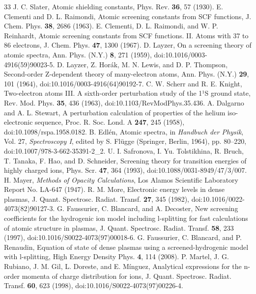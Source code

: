 \documentclass[aps,pra,preprint,notitlepage,superscriptaddress,amsmath,amssymb]{revtex4-2}
\begin{document}
\begin{thebibliography}{33}
 J. C. Slater, Atomic shielding constants, Phys. Rev. \textbf{36}, 57 (1930).
 E. Clementi and D. L. Raimondi, Atomic screening constants from SCF functions, J. Chem. Phys. \textbf{38}, 2686 (1963).
 E. Clementi, D. L. Raimondi, and W. P. Reinhardt, Atomic screening constants from SCF functions. II. Atoms with 37 to 86 electrons, J. Chem. Phys. \textbf{47}, 1300 (1967).
 D. Layzer, On a screening theory of atomic spectra, Ann. Phys. (N.Y.) \textbf{8}, 271 (1959), doi:10.1016/0003-4916(59)90023-5.
 D. Layzer, Z. Horák, M. N. Lewis, and D. P. Thompson, Second-order Z-dependent theory of many-electron atoms, Ann. Phys. (N.Y.) \textbf{29}, 101 (1964), doi:10.1016/0003-4916(64)90192-7.
 C. W. Scherr and R. E. Knight, Two-electron atoms III. A sixth-order perturbation study of the 1¹S ground state, Rev. Mod. Phys. \textbf{35}, 436 (1963), doi:10.1103/RevModPhys.35.436.
 A. Dalgarno and A. L. Stewart, A perturbation calculation of properties of the helium iso-electronic sequence, Proc. R. Soc. Lond. A \textbf{247}, 245 (1958), doi:10.1098/rspa.1958.0182.
 B. Edlén, Atomic spectra, in \emph{Handbuch der Physik}, Vol. 27, \emph{Spectroscopy I}, edited by S. Flügge (Springer, Berlin, 1964), pp. 80–220, doi:10.1007/978-3-662-35391-2\_2.
 U. I. Safronova, I. Yu. Tolstikhina, R. Bruch, T. Tanaka, F. Hao, and D. Schneider, Screening theory for transition energies of highly charged ions, Phys. Scr. \textbf{47}, 364 (1993), doi:10.1088/0031-8949/47/3/007.
 H. Mayer, \emph{Methods of Opacity Calculations}, Los Alamos Scientific Laboratory Report No. LA-647 (1947).
 R. M. More, Electronic energy levels in dense plasmas, J. Quant. Spectrosc. Radiat. Transf. \textbf{27}, 345 (1982), doi:10.1016/0022-4073(82)90127-3.
 G. Faussurier, C. Blancard, and A. Decoster, New screening coefficients for the hydrogenic ion model including l-splitting for fast calculations of atomic structure in plasmas, J. Quant. Spectrosc. Radiat. Transf. \textbf{58}, 233 (1997), doi:10.1016/S0022-4073(97)00018-6.
 G. Faussurier, C. Blancard, and P. Renaudin, Equation of state of dense plasmas using a screened-hydrogenic model with l-splitting, High Energy Density Phys. \textbf{4}, 114 (2008).
 P. Martel, J. G. Rubiano, J. M. Gil, L. Doreste, and E. Mínguez, Analytical expressions for the n-order momenta of charge distribution for ions, J. Quant. Spectrosc. Radiat. Transf. \textbf{60}, 623 (1998), doi:10.1016/S0022-4073(97)00226-4.

\end{thebibliography}
\end{document}
